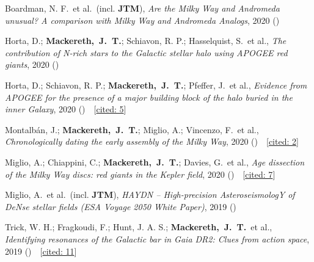 \item[{\scriptsize7}]Boardman, N. F.~et al.~(incl. \textbf{JTM}), \textit{Are the Milky Way and Andromeda unusual? A comparison with Milky Way and Andromeda Analogs}, 2020 ()

\item[{\scriptsize6}]Horta, D.; \textbf{Mackereth,~J.~T.}; Schiavon, R. P.; Hasselquist, S.~et al., \textit{The contribution of N-rich stars to the Galactic stellar halo using APOGEE red giants}, 2020 ()

\item[{\scriptsize5}]Horta, D.; Schiavon, R. P.; \textbf{Mackereth,~J.~T.}; Pfeffer, J.~et al., \textit{Evidence from APOGEE for the presence of a major building block of the halo buried in the inner Galaxy}, 2020 ()~~{\footnotesize[\href{http://adsabs.harvard.edu/abs/2020arXiv200710374H}{cited: 5}]}

\item[{\scriptsize4}]Montalb{\'a}n, J.; \textbf{Mackereth,~J.~T.}; Miglio, A.; Vincenzo, F.~et al., \textit{Chronologically dating the early assembly of the Milky Way}, 2020 ()~~{\footnotesize[\href{http://adsabs.harvard.edu/abs/2020arXiv200601783M}{cited: 2}]}

\item[{\scriptsize3}]Miglio, A.; Chiappini, C.; \textbf{Mackereth,~J.~T.}; Davies, G.~et al., \textit{Age dissection of the Milky Way discs: red giants in the Kepler field}, 2020 ()~~{\footnotesize[\href{http://adsabs.harvard.edu/abs/2020arXiv200414806M}{cited: 7}]}

\item[{\scriptsize2}]Miglio, A.~et al.~(incl. \textbf{JTM}), \textit{HAYDN -- High-precision AsteroseismologY of DeNse stellar fields (ESA Voyage 2050 White Paper)}, 2019 ()

\item[{\scriptsize1}]Trick, W. H.; Fragkoudi, F.; Hunt, J. A. S.; \textbf{Mackereth,~J.~T.}~et al., \textit{Identifying resonances of the Galactic bar in Gaia DR2: Clues from action space}, 2019 ()~~{\footnotesize[\href{http://adsabs.harvard.edu/abs/2019arXiv190604786T}{cited: 11}]}